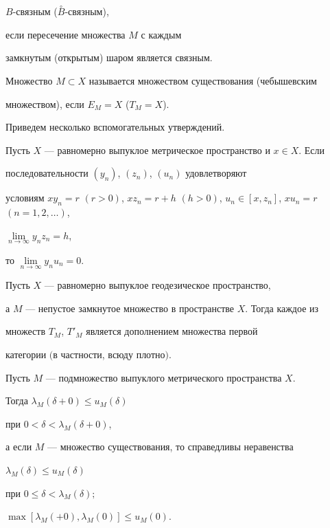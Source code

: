 $B$-связным ($\overset{\circ}{B}$-связным),


если пересечение множества $M$ с каждым 


замкнутым (открытым) шаром является связным. 


Множество $M \subset X$ называется множеством существования (чебышевским


множеством), если $E_{M} = X$ ($T_{M} = X$).





Приведем несколько вспомогательных утверждений.





\begin{lem}


Пусть $X$ --- равномерно выпуклое метрическое пространство и $x \in X$. Если


последовательности $(y_{n})$, $(z_{n})$, $(u_{n})$ удовлетворяют


условиям $xy_{n} = r$ $(r>0)$, $xz_{n} = r + h$ $(h>0)$, $u_{n} \in


[x,z_{n}]$, $xu_{n} = r$ $(n = 1,2,\dotsc)$,


$\lim \limits_{n \to \infty}{y_{n}z_{n}} =h$, 


то $\lim \limits_{n \to \infty}{y_{n}u_{n}} = 0$.


\end{lem}





\begin{prop}


Пусть $X$ --- равномерно выпуклое геодезическое пространство,


а $M$ --- непустое замкнутое множество в пространстве $X$. Тогда каждое из


множеств $T_{M}$, $T'_{M}$ является дополнением множества первой


категории $($в частности, всюду плотно$)$.


\end{prop}





\begin{prop}


Пусть $M$ --- подмножество выпуклого метрического пространства $X$. 


Тогда $\lambda_{M}(\delta + 0) \leq u_{M}(\delta )$


при $0 < \delta < \lambda _{M}(\delta + 0)$,


а если $M$ --- множество существования, то справедливы неравенства 


$\lambda _{M}(\delta ) \leq u_{M}(\delta )$


при $0 \leq \delta < \lambda _{M}(\delta );$


$\max [\lambda _{M}(+0),\lambda _{M}(0)] \leq u_{M}(0)$.


\end{prop}






